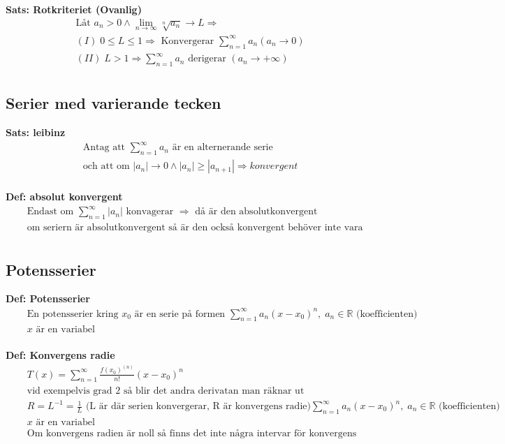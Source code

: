 \textbf{Sats: Rotkriteriet (Ovanlig)}
\begin{align*}
  &\quad  \text{Låt } a_n>0 \land \lim_{n\to{\infty}}\sqrt[n]{a_n} \to L \Rightarrow \\
  &\quad  (I) \; 0 \leq L \leq 1 \Rightarrow \text{ Konvergerar } \displaystyle\sum_{n=1}^{\infty}a_n
  (a_n \to 0) \\
  &\quad  (II) \; L>1 \Rightarrow \displaystyle\sum_{n=1}^{\infty}a_n \text{ derigerar }
  (a_n \to +\infty) \\
\end{align*}

\subsection{Serier med varierande tecken}
\textbf{Sats: leibinz}
\begin{align*}
  &\quad  \text{Antag att } \displaystyle\sum_{n=1}^{\infty}a_n \text{ är en alternerande serie } \\
  &\quad  \text{och att om } |a_n| \to 0 \land |a_n|\geq|a_{n+1}| \Rightarrow konvergent \\
\end{align*}

\textbf{Def: absolut konvergent}
\begin{align*}
  &\quad  \text{Endast om } \displaystyle\sum_{n=1}^{\infty}|a_n| \text{ konvagerar } \Rightarrow
  \text{ då är den absolutkonvergent} \\
  &\quad \text{om seriern är absolutkonvergent så är den också konvergent behöver inte vara tvärtom} \\
\end{align*}


\subsection{Potensserier}
\textbf{Def: Potensserier}
\begin{align*}
  &\quad  \text{En potensserier kring $x_0$ är en serie på formen }
  \displaystyle\sum_{n=1}^{\infty}a_n{(x-x_0)}^n, \; a_n \in \mathbb{R} \text{ (koefficienten)} \\
  &\quad  x \text{ är en variabel} \\
\end{align*}

\textbf{Def: Konvergens radie}
\begin{align*}
  &\quad  T(x)=\displaystyle\sum_{n=1}^{\infty}\frac{{f(x_0)}^{(n)}}{n!}{(x-x_0)}^n \\
  &\quad  \text{vid exempelvis grad 2 så blir det andra derivatan man räknar ut} \\
  &\quad  R=L^{-1}=\frac{1}{L} \text{ (L är där serien konvergerar, R är konvergens radie)}
  \displaystyle\sum_{n=1}^{\infty}a_n{(x-x_0)}^n, \; a_n \in \mathbb{R} \text{ (koefficienten)} \\
  &\quad  x \text{ är en variabel} \\
  &\quad  \text{Om konvergens radien är noll så finns det inte några intervar för konvergens eller divergens}
\end{align*}

